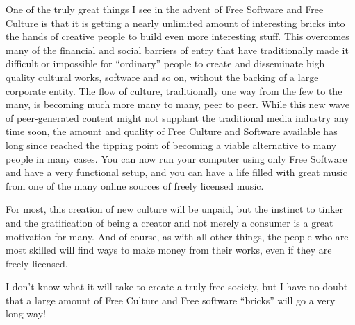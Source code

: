 One of the truly great things I see in the advent of Free Software and Free
Culture is that it is getting a nearly unlimited amount of interesting bricks
into the hands of creative people to build even more interesting stuf\hbox{}f.
This overcomes many of the f\hbox{}inancial and social barriers of entry that
have traditionally made it dif\hbox{}f\hbox{}icult or impossible for
``ordinary'' people to create and disseminate high quality cultural works,
software and so on, without the backing of a large corporate entity. The
f\hbox{}low of culture, traditionally one way from the few to the many, is
becoming much more many to many, peer to peer.  While this new wave of
peer-generated content might not supplant the traditional media industry any
time soon, the amount and quality of Free Culture and Software available has
long since reached the tipping point of becoming a viable alternative to many
people in many cases. You can now run your computer using only Free Software and
have a very functional setup, and you can have a life f\hbox{}illed with great
music from one of the many online sources of freely licensed music.

For most, this creation of new culture will be unpaid, but the instinct to
tinker and the gratif\hbox{}ication of being a creator and not merely a consumer
is a great motivation for many. And of course, as with all other things, the
people who are most skilled will f\hbox{}ind ways to make money from their
works, even if they are freely licensed.

I don't know what it will take to create a truly free society, but I have no
doubt that a large amount of Free Culture and Free software ``bricks'' will go a
very long way!

